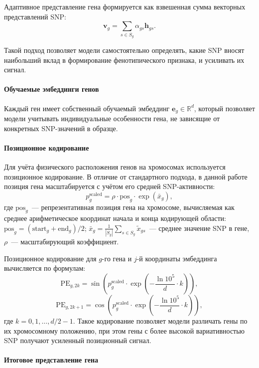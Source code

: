 Адаптивное представление гена формируется как взвешенная сумма векторных 
представлений SNP:
\[
\mathbf{v}_g = \sum_{s \in S_g} \alpha_{gs} \mathbf{h}_{gs}.
\]

Такой подход позволяет модели самостоятельно определять, какие SNP вносят 
наибольший вклад в формирование фенотипического признака, и усиливать их 
сигнал.

\paragraph{Обучаемые эмбеддинги генов}

Каждый ген имеет собственный обучаемый эмбеддинг $\mathbf{e}_g \in \mathbb{R}^d$, 
который позволяет модели учитывать индивидуальные особенности гена, 
не зависящие от конкретных SNP-значений в образце.

\paragraph{Позиционное кодирование}

Для учёта физического расположения генов на хромосомах используется 
позиционное кодирование. В отличие от стандартного подхода, в данной 
работе позиция гена масштабируется с учётом его средней SNP-активности:
\[
p_g^{\text{scaled}} = \rho \cdot \text{pos}_g \cdot \exp(\bar{x}_g),
\]
где $\text{pos}_g$~--- репрезентативная позиция гена на хромосоме, 
вычисляемая как среднее арифметическое координат начала и конца 
кодирующей области: $\text{pos}_g = (\text{start}_g + \text{end}_g) / 2$; 
$\bar{x}_g = \frac{1}{|S_g|} \sum_{s \in S_g} \tilde{x}_{gs}$~--- среднее 
значение SNP в гене, $\rho$~--- масштабирующий коэффициент.

Позиционное кодирование для $g$-го гена и $j$-й координаты эмбеддинга 
вычисляется по формулам:
\[
\text{PE}_{g,2k} = \sin\left(p_g^{\text{scaled}} \cdot 
\exp\left(-\frac{\ln 10^5}{d} \cdot k\right)\right),
\]
\[
\text{PE}_{g,2k+1} = \cos\left(p_g^{\text{scaled}} \cdot 
\exp\left(-\frac{\ln 10^5}{d} \cdot k\right)\right),
\]
где $k = 0, 1, \dots, d/2 - 1$. Такое кодирование позволяет модели 
различать гены по их хромосомному положению, при этом гены с более 
высокой вариативностью SNP получают усиленный позиционный сигнал.

\paragraph{Итоговое представление гена}

